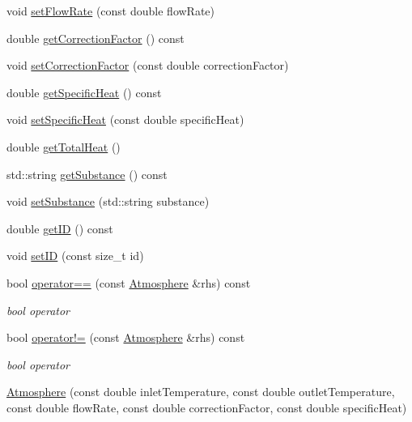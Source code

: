 \begin{DoxyCompactItemize}
\item 
void \hyperlink{class_atmosphere_a9ff0b718c810aec0bb101336db69fd22}{set\+Flow\+Rate} (const double flow\+Rate)
\item 
double \hyperlink{class_atmosphere_a79c94343c7b6659b2f79688a1ba69aed}{get\+Correction\+Factor} () const
\item 
void \hyperlink{class_atmosphere_a86fab4b05de35c9a2b1a3a7e5ab70779}{set\+Correction\+Factor} (const double correction\+Factor)
\item 
double \hyperlink{class_atmosphere_a59802a10861a58ab0f0f4e0ab8671e14}{get\+Specific\+Heat} () const
\item 
void \hyperlink{class_atmosphere_a17450de3bc7a64b2736b1fe8785410cd}{set\+Specific\+Heat} (const double specific\+Heat)
\item 
double \hyperlink{class_atmosphere_ad3dd28020262aee76d374cbfb7998e46}{get\+Total\+Heat} ()
\item 
std\+::string \hyperlink{class_atmosphere_a3ac0fb0d4fc92edc690e44b40b7018c2}{get\+Substance} () const
\item 
void \hyperlink{class_atmosphere_aa92f55a1f07304f3e57fdfb8ece65d82}{set\+Substance} (std\+::string substance)
\item 
double \hyperlink{class_atmosphere_a4dfda799563c28438db1b23cbee6e099}{get\+ID} () const
\item 
void \hyperlink{class_atmosphere_a156e09f05336057be5591146948f6046}{set\+ID} (const size\+\_\+t id)
\item 
\mbox{\label{class_atmosphere_a6bddf411a91af4808f52cd69033a5c54}} 
bool \hyperlink{class_atmosphere_a6bddf411a91af4808f52cd69033a5c54}{operator==} (const \hyperlink{class_atmosphere}{Atmosphere} \&rhs) const
\begin{DoxyCompactList}\small\item\em bool operator \end{DoxyCompactList}\item 
\mbox{\label{class_atmosphere_a8f75154e49eb74561dc9053607f502f9}} 
bool \hyperlink{class_atmosphere_a8f75154e49eb74561dc9053607f502f9}{operator!=} (const \hyperlink{class_atmosphere}{Atmosphere} \&rhs) const
\begin{DoxyCompactList}\small\item\em bool operator \end{DoxyCompactList}\item 
\hyperlink{class_atmosphere_adbd727cfc7682d3b3b72a4fb101531f1}{Atmosphere} (const double inlet\+Temperature, const double outlet\+Temperature, const double flow\+Rate, const double correction\+Factor, const double specific\+Heat)

\end{DoxyCompactItemize}
